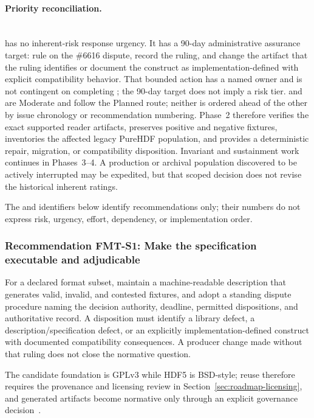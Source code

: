 \documentclass[../main.tex]{subfiles}
\begin{document}
\paragraph{Priority reconciliation.}\mbox{}\\
 has no inherent-risk response urgency. It has a 90-day
administrative assurance target: rule on the \#6616 dispute, record the ruling,
and change the artifact that the ruling identifies or document the construct as
implementation-defined with explicit compatibility behavior. That bounded
action has a named owner and is not contingent on completing ; the
90-day target does not imply a risk tier.
 and  are Moderate and follow the Planned
route; neither is ordered
ahead of the other by issue chronology or recommendation numbering. Phase~2
therefore verifies the exact supported reader artifacts, preserves positive and
negative fixtures, inventories the affected legacy PureHDF population, and
provides a deterministic repair, migration, or compatibility disposition.
Invariant and sustainment work continues in Phases~3--4. A production or
archival population discovered to be actively interrupted may be expedited,
but that scoped decision does not revise the historical inherent ratings.

The  and  identifiers below identify recommendations
only; their numbers do not express risk, urgency, effort, dependency, or
implementation order.

\subsubsection*{Recommendation FMT-S1: Make the specification executable and adjudicable}

For a declared format subset, maintain a machine-readable description that
generates valid, invalid, and contested fixtures, and adopt a standing dispute
procedure naming the decision authority, deadline, permitted dispositions, and
authoritative record. A disposition must identify a library defect, a
description/specification defect, or an explicitly implementation-defined
construct with documented compatibility consequences. A producer change made
without that ruling does not close the normative question.

The candidate  foundation is GPLv3 while HDF5 is BSD-style;
reuse therefore requires the provenance and licensing review in
Section~\ref{sec:roadmap-licensing}, and generated artifacts become normative
only through an explicit governance decision~\cite{h5lens}.
\end{document}
